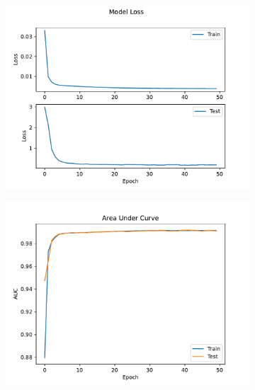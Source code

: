 \documentclass[12pt, a4paper]{book}
\begin{document}
\begin{figure}[!ht]
	\centering
	\begin{subfigure}[b]{0.49\textwidth}
      \centering
      \includegraphics[width=1\textwidth]{No_pad/Loss.pdf}
   \end{subfigure}
   \hfill
	\begin{subfigure}[b]{0.49\textwidth}
      \centering
      \includegraphics[width=1\textwidth]{No_pad/AUC.pdf}
   \end{subfigure}
   \hfill
	\begin{subfigure}[b]{0.49\textwidth}
      \centering

\end{subfigure}
\end{figure}
\end{document}
